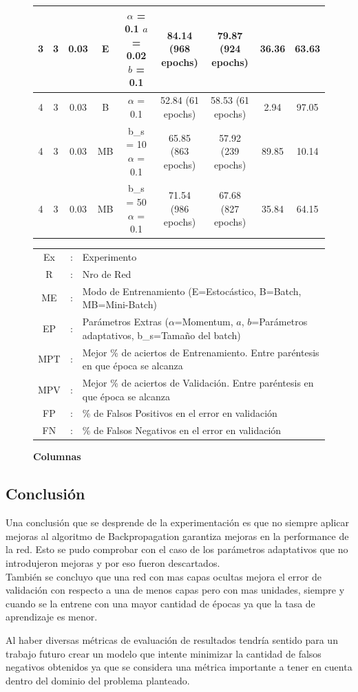 \begin{figure}[H]
\begin{longtable}{ccccccccc}
	\hline
	3 & 3 & 0.03 & E  & \tcell{$\alpha$ = 0.1\\ $a$ = 0.02\\ $b$ = 0.1} & 84.14 (968 epochs) & 79.87 (924 epochs) & 36.36  & 63.63 \\
	\hline
	\hline
	4 & 3 & 0.03 & B  & $\alpha$ = 0.1                        & 52.84 (61 epochs)  & 58.53 (61 epochs)  & 2.94   & 97.05 \\
	\hline
	4 & 3 & 0.03 & MB & \tcell{b\_s = 10\\ $\alpha$ = 0.1}      & 65.85 (863 epochs) & 57.92 (239 epochs) & 89.85  & 10.14 \\
	\hline
	4 & 3 & 0.03 & MB & \tcell{b\_s = 50\\ $\alpha$ = 0.1}      & 71.54 (986 epochs) & 67.68 (827 epochs) & 35.84  & 64.15 \\
	\hline
\end{longtable}
\caption{\textbf{Columnas}}
\begin{tabular}{ccl}
         Ex & : & Experimento \\
         R & : & Nro de Red \\
         ME & : & Modo de Entrenamiento (E=Estocástico, B=Batch, MB=Mini-Batch)\\
         EP & : & Parámetros Extras ($\alpha$=Momentum, $a$, $b$=Parámetros adaptativos, b\_s=Tamaño del batch)\\
         MPT & : & Mejor \% de aciertos de Entrenamiento. Entre paréntesis en que época se alcanza\\
         MPV & : & Mejor \% de aciertos de Validación. Entre paréntesis en que época se alcanza\\
         FP & : & \% de Falsos Positivos en el error en validación\\
         FN & : & \% de Falsos Negativos en el error en validación
\end{tabular}
\end{figure}



\subsection{Conclusión}
Una conclusión que se desprende de la experimentación es que no siempre aplicar mejoras al algoritmo de Backpropagation garantiza mejoras en la performance de la red. Esto
se pudo comprobar con el caso de los parámetros adaptativos que no introdujeron mejoras y por eso fueron descartados. \\
También se concluyo que una red con mas capas ocultas mejora el error de validación con respecto a una de menos capas pero con mas unidades, siempre y cuando se la entrene
con una mayor cantidad de épocas ya que la tasa de aprendizaje es menor.

Al haber diversas métricas de evaluación de resultados tendría sentido para un trabajo futuro crear un modelo que intente minimizar la cantidad de falsos negativos obtenidos
 ya que se considera una métrica importante a tener en cuenta dentro del dominio del problema planteado.

\newpage
